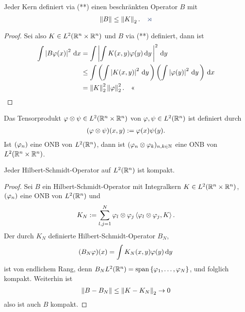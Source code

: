 \begin{lem*}
Jeder Kern definiert via (**) einen beschränkten Operator $B$ mit
\begin{align*}
\norm{B}\le \norm{K}_2.\fishhere
\end{align*}
\end{lem*}
\begin{proof}
Sei also $K\in L^2(\mathbb{R}^n\times \mathbb{R}^n)$ und $B$ via (**) definiert, dann ist
\begin{align*}
\int \left|B\varphi(x)\right|^2\,\mathrm{d} x &= 
\int \left|\int K(x,y)\varphi(y)\,\mathrm{d} y\,\right|^2\,\mathrm{d} y\,\\
&\le
\int \left(\int \left|K(x,y)\right|^2\,\mathrm{d} y\, \right)
\left(\int \left|\varphi(y)\right|^2 \,\mathrm{d} y\, \right)\,\mathrm{d} x\\
&= \left\|K\right\|_2^2\left\|\varphi\right\|_2^2.\quad\text{<<}
\end{align*}
\end{proof}

Das Tensorprodukt $\varphi\otimes \psi\in L^2(\mathbb{R}^n\times\mathbb{R}^n)$ von $\varphi,\psi\in
L^2(\mathbb{R}^n)$ ist definiert durch
\begin{align*}
(\varphi\otimes\psi)(x,y) := \varphi(x)\psi(y). 
\end{align*}
Ist $(\varphi_n)$ eine ONB von $L^2(\mathbb{R}^n)$, dann ist
$(\varphi_n\otimes\varphi_k)_{n,k\in\mathbb{N}}$ eine ONB von $L^2(\mathbb{R}^n\times\mathbb{R}^n)$.

\begin{thm}
\label{prop:7.5}
Jeder Hilbert-Schmidt-Operator auf $L^2(\mathbb{R}^n)$ ist kompakt.\fishhere
\end{thm}
\begin{proof}
Sei $B$ ein Hilbert-Schmidt-Operator mit Integralkern $K\in
L^2(\mathbb{R}^n\times\mathbb{R}^n)$, $(\varphi_n)$ eine ONB von $L^2(\mathbb{R}^n)$ und
\begin{align*}
K_N := \sum_{l,j=1}^N \varphi_l\otimes\varphi_j \left\langle\varphi_l\otimes \varphi_j,K\right\rangle.
\end{align*}
Der durch $K_N$ definierte Hilbert-Schmidt-Operator $B_N$,
\begin{align*}
(B_N\varphi)(x) = \int K_N(x,y)\varphi(y)\,\mathrm{d} y\, 
\end{align*}
ist von endlichem Rang, denn $B_NL^2(\mathbb{R}^n)=\mathrm{span
}\left\{ \varphi_1,\ldots,\varphi_N \right\}$, und folglich kompakt. Weiterhin ist
\begin{align*}
\left\|B-B_N\right\|\le \left\|K-K_N\right\|_2 \to 0
\end{align*}
also ist auch $B$ kompakt.\qedhere
\end{proof}

